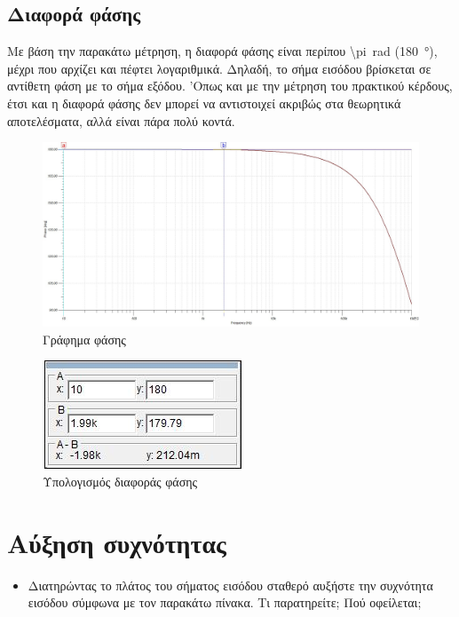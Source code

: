 \documentclass[12pt]{article}
\begin{document}
\subsection{Διαφορά φάσης}

Με βάση την παρακάτω μέτρηση, η διαφορά φάσης είναι περίπου \SI{\pi}{\radian}
(\SI{180}{\degree}), μέχρι που αρχίζει και πέφτει λογαριθμικά. Δηλαδή, το σήμα
εισόδου βρίσκεται σε αντίθετη φάση με το σήμα εξόδου. 'Οπως και με την μέτρηση
του πρακτικού κέρδους, έτσι και η διαφορά φάσης δεν μπορεί να αντιστοιχεί
ακριβώς στα θεωρητικά αποτελέσματα, αλλά είναι πάρα πολύ κοντά.

\begin{figure}[H]
	\centering
	\includegraphics[width=\linewidth]{./res/phase.jpg}
	\caption{Γράφημα φάσης}
\end{figure}
\begin{figure}[H]
	\centering
	\includegraphics{./res/phasecalc.jpg}
	\caption{Υπολογισμός διαφοράς φάσης}
\end{figure}

\section{Αύξηση συχνότητας}

\begin{itemize}
	\item Διατηρώντας το πλάτος του σήματος εισόδου σταθερό αυξήστε την
		συχνότητα εισόδου σύμφωνα με τον παρακάτω πίνακα. Τι
		παρατηρείτε; Πού οφείλεται;
\end{itemize}
\end{document}
